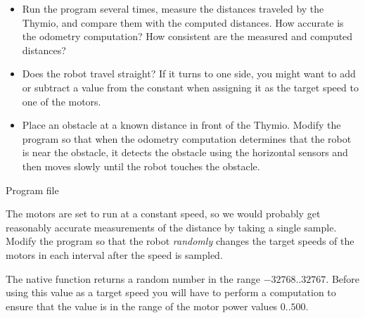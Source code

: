 
\begin{itemize}
\item Run the program several times, measure the distances traveled by the Thymio,
and compare them with the computed distances. How accurate is the odometry
computation? How consistent are the measured and computed distances?

\item Does the robot travel straight? If it turns to one side, you might want to
add or subtract a value from the constant  when assigning it as
the target speed to one of the motors.

\item Place an obstacle at a known distance in front of the Thymio.
Modify the program so that when the odometry computation determines
that the robot is near the obstacle, it detects the obstacle using
the horizontal sensors and then moves slowly until the robot touches the obstacle.

\end{itemize}


{\raggedleft \hfill Program file }

The motors are set to run at a constant speed,
so we would probably get reasonably accurate measurements of the distance
by taking a single sample.
Modify the program so that the robot \emph{randomly} changes the target speeds
of the motors in each interval after the speed is sampled.

The native function  returns a random
number in the range $-32768 .. 32767$. Before using this value as a target
speed you will have to perform a computation to ensure that the value is in
the range of the motor power values $0 .. 500$.



